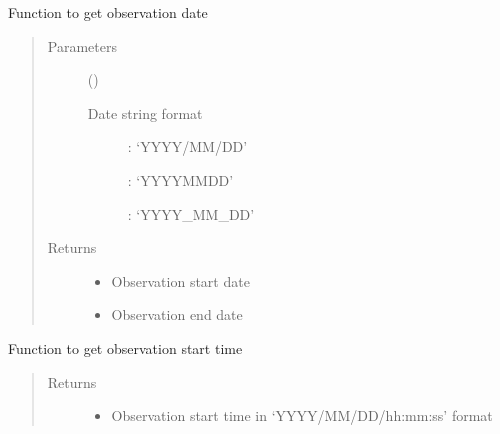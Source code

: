 \documentclass[letterpaper,10pt,english]{sphinxmanual}
\begin{document}
\begin{fulllineitems}
\begin{fulllineitems}
\label{\detokenize{paircars:paircars.access_ms.AccessMS.get_obs_date}}
\sphinxAtStartPar
Function to get observation date
\begin{quote}\begin{description}
\item[{Parameters}] \leavevmode
\sphinxAtStartPar
{} () \textendash{} \begin{description}
\item[{Date string format}] \leavevmode
{}: ‘YYYY/MM/DD’

: ‘YYYY\sphinxhyphen{}MM\sphinxhyphen{}DD’

: ‘YYYY\_MM\_DD’

\end{description}


\item[{Returns}] \leavevmode
\sphinxAtStartPar
\begin{itemize}
\item {} 
\sphinxAtStartPar
{} \textendash{} Observation start date

\item {} 
\sphinxAtStartPar
{} \textendash{} Observation end date

\end{itemize}


\end{description}\end{quote}

\end{fulllineitems}


\begin{fulllineitems}
\label{\detokenize{paircars:paircars.access_ms.AccessMS.get_obs_startend_time}}
\sphinxAtStartPar
Function to get observation start time
\begin{quote}\begin{description}
\item[{Returns}] \leavevmode
\sphinxAtStartPar
\begin{itemize}
\item {} 
\sphinxAtStartPar
{} \textendash{} Observation start time in ‘YYYY/MM/DD/hh:mm:ss’ format


\end{itemize}
\end{description}
\end{quote}
\end{fulllineitems}
\end{fulllineitems}
\end{document}
